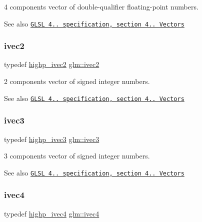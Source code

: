 4 components vector of double-\/qualifier floating-\/point numbers.

\begin{DoxySeeAlso}{See also}
\href{http://www.opengl.org/registry/doc/GLSLangSpec.4.20.8.pdf}{\tt G\+L\+SL 4.. specification, section 4.. Vectors} 
\end{DoxySeeAlso}
\mbox{\label{group__core__types_ga9e6ce9cfc7919976b318197e18d8a065}} 
\subsubsection{\texorpdfstring{ivec2}{ivec2}}
{\footnotesize\ttfamily typedef \hyperlink{group__core__precision_gad2b0693752b92e6644be9f1c3e50a451}{highp\+\_\+ivec2} \hyperlink{group__core__types_ga9e6ce9cfc7919976b318197e18d8a065}{glm\+::ivec2}}

2 components vector of signed integer numbers.

\begin{DoxySeeAlso}{See also}
\href{http://www.opengl.org/registry/doc/GLSLangSpec.4.20.8.pdf}{\tt G\+L\+SL 4.. specification, section 4.. Vectors} 
\end{DoxySeeAlso}
\mbox{\label{group__core__types_ga6e12a4ca00d696f07da1df4eb73e0fe8}} 
\subsubsection{\texorpdfstring{ivec3}{ivec3}}
{\footnotesize\ttfamily typedef \hyperlink{group__core__precision_ga52ba3edf3183078cf4129e6193b32a2c}{highp\+\_\+ivec3} \hyperlink{group__core__types_ga6e12a4ca00d696f07da1df4eb73e0fe8}{glm\+::ivec3}}

3 components vector of signed integer numbers.

\begin{DoxySeeAlso}{See also}
\href{http://www.opengl.org/registry/doc/GLSLangSpec.4.20.8.pdf}{\tt G\+L\+SL 4.. specification, section 4.. Vectors} 
\end{DoxySeeAlso}
\mbox{\label{group__core__types_gaa4560ddc50320ea8f8a70d5c9c249fea}} 
\subsubsection{\texorpdfstring{ivec4}{ivec4}}
{\footnotesize\ttfamily typedef \hyperlink{group__core__precision_gaff761e336e3b52f04e725fa85c6d36d1}{highp\+\_\+ivec4} \hyperlink{group__core__types_gaa4560ddc50320ea8f8a70d5c9c249fea}{glm\+::ivec4}}

